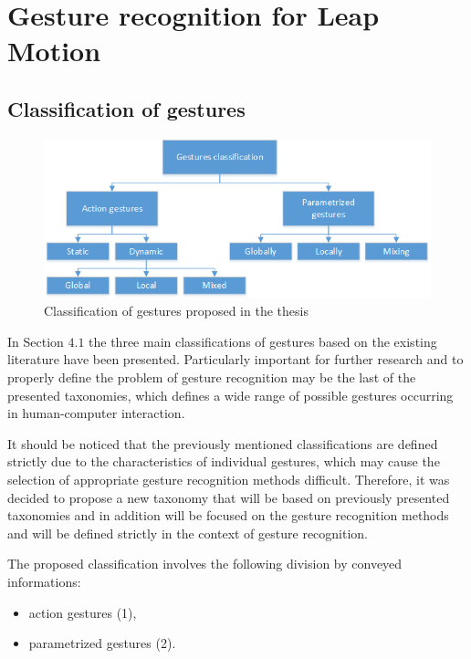 \chapter{Gesture recognition for Leap Motion}

\section{Classification of gestures}

\begin{figure}[htb]
\centering
 \includegraphics[width=0.8\columnwidth]{figures/gestureClassification.png}
 \caption[]{Classification of gestures proposed in the thesis}
 \label{thesisgesturetypes}
\end{figure}

In Section $4.1$ the three main classifications of gestures based on the existing literature have been presented. Particularly important for further research and to properly define the problem of gesture recognition may be the last of the presented taxonomies, which defines a wide range of possible gestures occurring in human-computer interaction.

It should be noticed that the previously mentioned classifications are defined strictly due to the characteristics of individual gestures, which may cause the selection of appropriate gesture recognition methods difficult. Therefore, it was decided to propose a new taxonomy that will be based on previously presented taxonomies \cite{kammer_taxonomy_2010}\cite{Karam05ataxonomy}\cite{AignerTaxonomy} and in addition will be focused on the gesture recognition methods and will be defined strictly in the context of gesture recognition.

The proposed classification involves the following division by conveyed informations:
\begin{itemize}
\item action gestures (1),
\item parametrized gestures (2).
\end{itemize}

